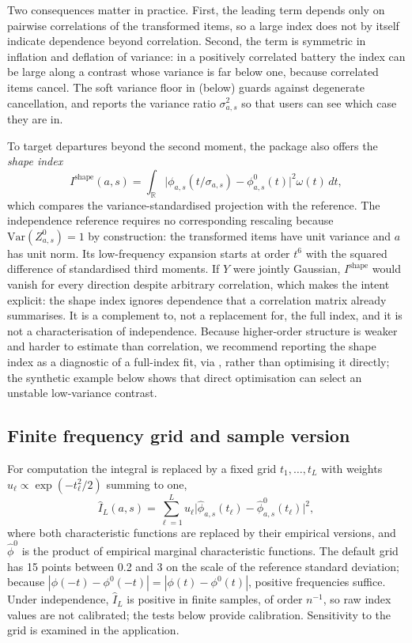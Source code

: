 Two consequences matter in practice. First, the leading term depends only on pairwise correlations of the transformed items, so a large index does not by itself indicate dependence beyond correlation. Second, the term is symmetric in inflation and deflation of variance: in a positively correlated battery the index can be large along a contrast whose variance is far below one, because correlated items cancel. The soft variance floor in  (below) guards against degenerate cancellation, and  reports the variance ratio $\sigma^2_{a,s}$ so that users can see which case they are in.

To target departures beyond the second moment, the package also offers the \emph{shape index}
\begin{equation}\label{eq:shape}
 I^{\mathrm{shape}}(a,s)=\int_{\mathbb{R}}\bigl|\phi_{a,s}(t/\sigma_{a,s})-\phi^0_{a,s}(t)\bigr|^2\omega(t)\,dt,
\end{equation}
which compares the variance-standardised projection with the reference. The independence reference requires no corresponding rescaling because $\mathrm{Var}(Z^0_{a,s})=1$ by construction: the transformed items have unit variance and $a$ has unit norm. Its low-frequency expansion starts at order $t^6$ with the squared difference of standardised third moments. If $Y$ were jointly Gaussian, $I^{\mathrm{shape}}$ would vanish for every direction despite arbitrary correlation, which makes the intent explicit: the shape index ignores dependence that a correlation matrix already summarises. It is a complement to, not a replacement for, the full index, and it is not a characterisation of independence. Because higher-order structure is weaker and harder to estimate than correlation, we recommend reporting the shape index as a diagnostic of a full-index fit, via , rather than optimising it directly; the synthetic example below shows that direct optimisation can select an unstable low-variance contrast.

\subsection{Finite frequency grid and sample version}
For computation the integral is replaced by a fixed grid $t_1,\ldots,t_L$ with weights $u_\ell\propto\exp(-t_\ell^2/2)$ summing to one,
\begin{equation}\label{eq:grid}
 \widehat I_L(a,s)=\sum_{\ell=1}^L u_\ell\bigl|\widehat\phi_{a,s}(t_\ell)-\widehat\phi^0_{a,s}(t_\ell)\bigr|^2,
\end{equation}
where both characteristic functions are replaced by their empirical versions, and $\widehat\phi^0$ is the product of empirical marginal characteristic functions. The default grid has 15 points between 0.2 and 3 on the scale of the reference standard deviation; because $|\phi(-t)-\phi^0(-t)|=|\phi(t)-\phi^0(t)|$, positive frequencies suffice. Under independence, $\widehat I_L$ is positive in finite samples, of order $n^{-1}$, so raw index values are not calibrated; the tests below provide calibration. Sensitivity to the grid is examined in the application.

